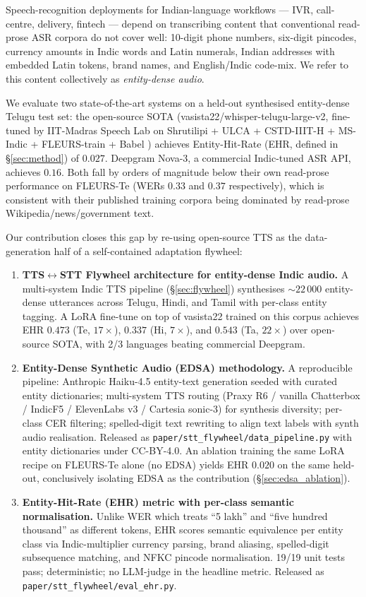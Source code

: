 \documentclass[conference,a4paper]{IEEEtran}
\begin{document}
Speech-recognition deployments for Indian-language workflows --- IVR, call-centre, delivery, fintech --- depend on transcribing content that conventional read-prose ASR corpora do not cover well: 10-digit phone numbers, six-digit pincodes, currency amounts in Indic words and Latin numerals, Indian addresses with embedded Latin tokens, brand names, and English/Indic code-mix. We refer to this content collectively as \emph{entity-dense audio}.

We evaluate two state-of-the-art systems on a held-out synthesised entity-dense Telugu test set: the open-source SOTA (vasista22/whisper-telugu-large-v2, fine-tuned by IIT-Madras Speech Lab on Shrutilipi + ULCA + CSTD-IIIT-H + MS-Indic + FLEURS-train + Babel \cite{vasista22}) achieves Entity-Hit-Rate (EHR, defined in \S\ref{sec:method}) of $0.027$. Deepgram Nova-3, a commercial Indic-tuned ASR API, achieves $0.16$. Both fall by orders of magnitude below their own read-prose performance on FLEURS-Te (WERs $0.33$ and $0.37$ respectively), which is consistent with their published training corpora being dominated by read-prose Wikipedia/news/government text.

Our contribution closes this gap by re-using open-source TTS as the data-generation half of a self-contained adaptation flywheel:

\begin{enumerate}
\sloppy
\item \textbf{TTS$\leftrightarrow$STT Flywheel architecture for entity-dense Indic audio.} A multi-system Indic TTS pipeline (\S\ref{sec:flywheel}) synthesises $\sim22\,000$ entity-dense utterances across Telugu, Hindi, and Tamil with per-class entity tagging. A LoRA fine-tune on top of vasista22 trained on this corpus achieves EHR $0.473$ (Te, $17\times$), $0.337$ (Hi, $7\times$), and $0.543$ (Ta, $22\times$) over open-source SOTA, with 2/3 languages beating commercial Deepgram.
\item \textbf{Entity-Dense Synthetic Audio (EDSA) methodology.} A reproducible pipeline: Anthropic Haiku-4.5 entity-text generation seeded with curated entity dictionaries; multi-system TTS routing (Praxy R6 / vanilla Chatterbox / IndicF5 / ElevenLabs v3 / Cartesia sonic-3) for synthesis diversity; per-class CER filtering; spelled-digit text rewriting to align text labels with synth audio realisation. Released as \texttt{paper/stt\_flywheel/data\_pipeline.py} with entity dictionaries under CC-BY-4.0. An ablation training the same LoRA recipe on FLEURS-Te alone (no EDSA) yields EHR $0.020$ on the same held-out, conclusively isolating EDSA as the contribution (\S\ref{sec:edsa_ablation}).
\item \textbf{Entity-Hit-Rate (EHR) metric with per-class semantic normalisation.} Unlike WER which treats ``5 lakh'' and ``five hundred thousand'' as different tokens, EHR scores semantic equivalence per entity class via Indic-multiplier currency parsing, brand aliasing, spelled-digit subsequence matching, and NFKC pincode normalisation. 19/19 unit tests pass; deterministic; no LLM-judge in the headline metric. Released as \texttt{paper/stt\_flywheel/eval\_ehr.py}.
\end{enumerate}
\end{document}
